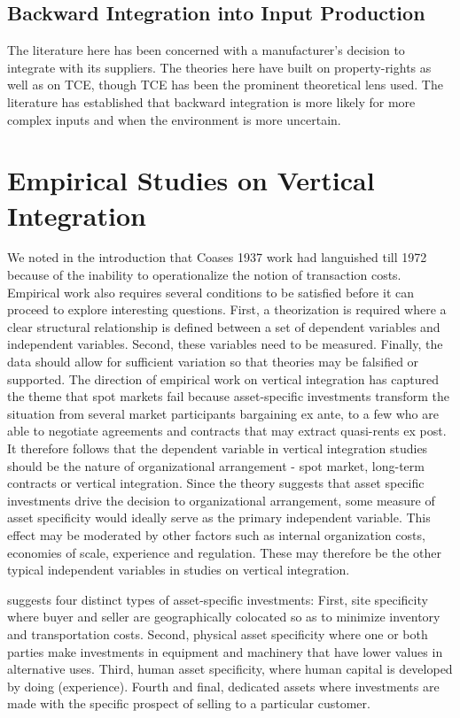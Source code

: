 \documentclass[12pt]{article}
\begin{document}
\subsection{Backward Integration into Input Production}
The literature here has been concerned with a manufacturer's decision to integrate with its suppliers. The theories here have built on property-rights as well as on TCE, though TCE has been the prominent theoretical lens used. The literature has established that backward integration is more likely for more complex inputs and when the environment is more uncertain.

\section{Empirical Studies on Vertical Integration}
We noted in the introduction that Coase\textquotesingle s 1937 work had languished till 1972 because of the inability to operationalize the notion of transaction costs. Empirical work also requires several conditions to be satisfied before it can proceed to explore interesting questions. First, a theorization is required where a clear structural relationship is defined between a set of dependent variables and independent variables. Second, these variables need to be measured. Finally, the data should allow for sufficient variation so that theories may be falsified or supported. The direction of empirical work on vertical integration has captured the theme that spot markets fail because asset-specific investments transform the situation from several market participants bargaining ex ante, to a few who are able to negotiate agreements and contracts that may extract quasi-rents ex post. It therefore follows that the dependent variable in vertical integration studies should be the nature of organizational arrangement - spot market, long-term contracts or vertical integration. Since the theory suggests that asset specific investments drive the decision to organizational arrangement, some measure of asset specificity would ideally serve as the primary independent variable. This effect may be moderated by other factors such as internal organization costs, economies of scale, experience and regulation. These may therefore be the other typical independent variables in studies on vertical integration.

\cite{Williamson1983} suggests four distinct types of asset-specific investments: First, site specificity where buyer and seller are geographically colocated so as to minimize inventory and transportation costs. Second,  physical asset specificity where one or both parties  make investments in equipment and machinery that have lower values in alternative uses. Third, human asset specificity, where human capital is developed by doing (experience). Fourth and final, dedicated assets where investments are made with the specific prospect of selling to a particular customer.
\end{document}

